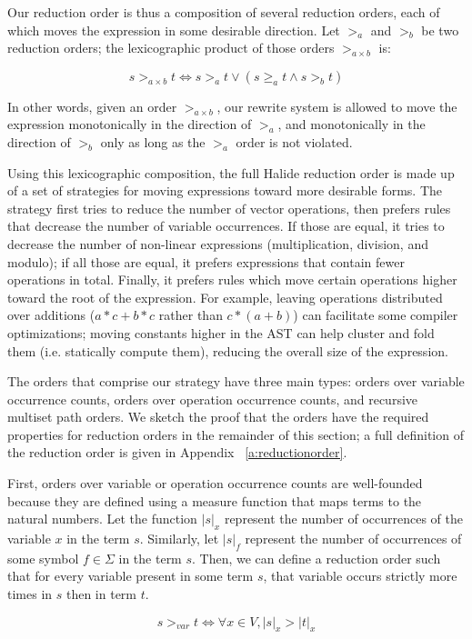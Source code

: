 \documentclass[sigplan,10pt,review,anonymous]{acmart}\settopmatter{printfolios=true,printccs=false,printacmref=false}
\begin{document}
Our reduction order is thus a composition of several reduction orders, each of
which moves the expression in some desirable direction. Let $>_a$ and $>_b$ be
two reduction orders; the lexicographic product of those orders $>_{a \times b}$
is:

\[
s >_{a \times b} t \iff s >_a t \vee (s \geq_a t \wedge s >_b t)
\] 

In other words, given an order $>_{a \times b}$, our rewrite system is allowed
to move the expression monotonically in the direction of $>_a$, and
monotonically in the direction of $>_b$ only as long as the $>_a$ order is not
violated.

Using this lexicographic composition, the full Halide reduction order is made up of a set of strategies for moving expressions toward more desirable forms. The strategy first tries to reduce the number of vector operations, then prefers rules that decrease the number of variable occurrences. If those are equal, it tries to decrease the number of non-linear expressions (multiplication, division, and modulo); if all those are equal, it prefers expressions that contain fewer operations in total. Finally, it prefers rules which move certain operations higher toward the root of the expression. For example,
leaving operations distributed over additions ($a*c + b*c$ rather than
$c*(a +b)$) can facilitate some compiler optimizations; moving constants higher in the
AST can help cluster and fold them (i.e. statically compute them), reducing the overall size of the expression.

The orders that comprise our strategy have three main types: orders over variable
occurrence counts, orders over operation occurrence counts, and recursive
multiset path orders. We sketch the proof that the orders have the required
properties for reduction orders in the remainder of this section; a full
definition of the reduction order is given in Appendix ~\ref{a:reductionorder}.

First, orders over variable or operation occurrence counts are well-founded 
because they are defined using a measure function that maps terms to the natural
numbers. Let the function $|s|_x$ represent the number of occurrences of the
variable $x$ in the term $s$. Similarly, let $|s|_f$ represent the number of
occurrences of some symbol $f \in \Sigma$ in the term $s$. Then, we can define a reduction order such that for every variable present in some term $s$, that variable occurs strictly more times in $s$ then in term $t$.

\begin{equation*}
s >_{var} t \iff \forall x \in V, |s|_x > |t|_x
\end{equation*}
\end{document}
